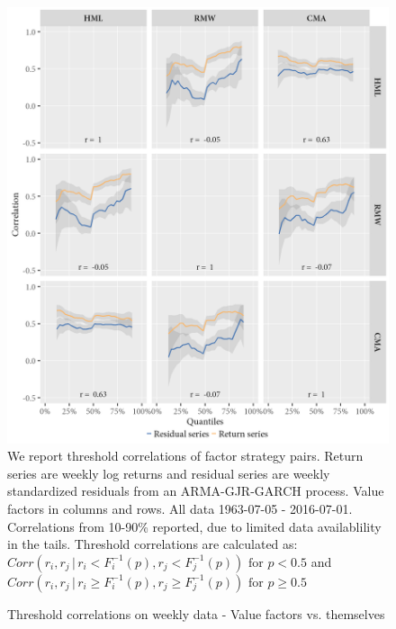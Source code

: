 \begin{figure}[H]
  \caption{Threshold correlations on weekly data - Value factors vs. themselves}
  \label{diag:thresholdvalue}
  \centering
  \begin{minipage}{\textwidth}
  \includegraphics[scale=1]{graphics/threshold_Value.png}  
  \vspace{3mm}
  \footnotesize
  We report threshold correlations of factor strategy pairs. Return series are weekly log returns and residual series are weekly standardized residuals from an ARMA-GJR-GARCH process. Value factors in columns and rows. All data 1963-07-05 - 2016-07-01. Correlations from 10-90\% reported, due to limited data availablility in the tails. Threshold correlations are calculated as: $Corr(r_i, r_j \,|\, r_i < F_i^{-1}(p), r_j < F_j^{-1}(p)) \text{ for } p < 0.5$ and $Corr(r_i, r_j \,|\, r_i \geq F_i^{-1}(p), r_j \geq F_j^{-1}(p)) \text{ for } p \geq 0.5$
  \end{minipage}
\end{figure}

